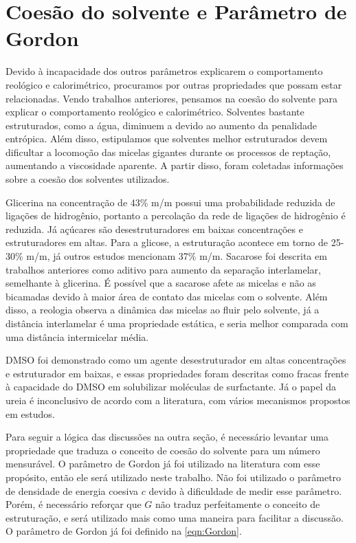		
		\FloatBarrier
		\section{Coesão do solvente e Parâmetro de Gordon}  %
		
		Devido à incapacidade dos outros parâmetros explicarem o comportamento reológico e calorimétrico, procuramos por outras propriedades que possam estar relacionadas. Vendo trabalhos anteriores, pensamos na coesão do solvente para explicar o comportamento reológico e calorimétrico. Solventes bastante estruturados, como a água, diminuem a \cmc{} devido ao aumento da penalidade entrópica. Além disso, estipulamos que solventes melhor estruturados devem dificultar a locomoção das micelas gigantes durante os processos de reptação, aumentando a viscosidade aparente. A partir disso, foram coletadas informações sobre a coesão dos solventes utilizados.
		
		Glicerina na concentração de 43\% m/m possui uma probabilidade reduzida de ligações de hidrogênio, portanto a percolação da rede de ligações de hidrogênio é reduzida. Já açúcares são desestruturadores em baixas concentrações e estruturadores em altas. Para a glicose, a estruturação acontece em torno de 25-30\% m/m, já outros estudos mencionam 37\% m/m. Sacarose foi descrita em trabalhos anteriores como aditivo para aumento da separação interlamelar, semelhante à glicerina. É possível que a sacarose afete as micelas e não as bicamadas devido à maior área de contato das micelas com o solvente. Além disso, a reologia observa a dinâmica das micelas ao fluir pelo solvente, já a distância interlamelar é uma propriedade estática, e seria melhor comparada com uma distância intermicelar média.
		
		DMSO foi demonstrado como um agente desestruturador em altas concentrações e estruturador em baixas, e essas propriedades foram descritas como fracas frente à capacidade do DMSO em solubilizar moléculas de surfactante. %
		Já o papel da ureia é inconclusivo de acordo com a literatura, com vários mecanismos propostos em estudos. %
		
		Para seguir a lógica das discussões na outra seção, é necessário levantar uma propriedade que traduza o conceito de coesão do solvente para um número mensurável. O parâmetro de Gordon já foi utilizado na literatura com esse propósito, então ele será utilizado neste trabalho. Não foi utilizado o parâmetro de densidade de energia coesiva \(c\) devido à dificuldade de medir esse parâmetro. Porém, é necessário reforçar que \(G\) não traduz perfeitamente o conceito de estruturação, e será utilizado mais como uma maneira para facilitar a discussão. O parâmetro de Gordon já foi definido na \autoref{eqn:Gordon}.
		
